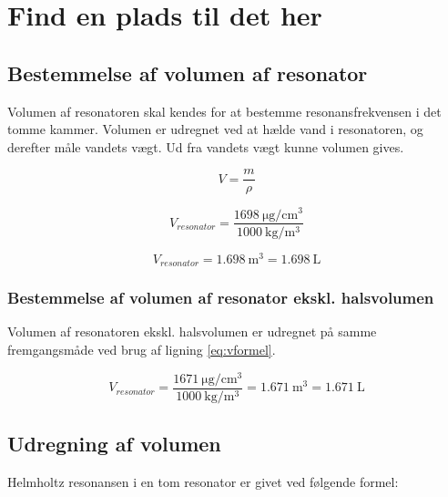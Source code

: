 \chapter{Find en plads til det her}

\section{Bestemmelse af volumen af resonator}

Volumen af resonatoren skal kendes for at bestemme resonansfrekvensen i det tomme kammer. Volumen er udregnet ved at hælde vand i resonatoren, og derefter måle vandets vægt. Ud fra vandets vægt kunne volumen gives. 

\begin{equation}
  V=\frac{m}{\rho}
  \label{eq:vformel}
\end{equation}

\begin{equation}
V_{resonator}=\frac{\SI{1698}{\micro\gram \per \centi\meter^{3}}}{\SI{1000}{\kilo \gram \per \meter^{3}}}
\end{equation}

\begin{equation}
	V_{resonator}={\SI{1.698}{\meter^{3}}}={\SI{1.698}{\liter}}
\end{equation}

\subsection{Bestemmelse af volumen af resonator ekskl. halsvolumen}

Volumen af resonatoren ekskl. halsvolumen er udregnet på samme fremgangsmåde ved brug af ligning \ref{eq:vformel}. 

\begin{equation}
V_{resonator}=\frac{\SI{1671}{\micro\gram \per \centi\meter^{3}}}{\SI{1000}{\kilo \gram \per \meter^{3}}}={\SI{1.671}{\meter^{3}}}={\SI{1.671}{\liter}}
\end{equation}

\section{Udregning af volumen}

Helmholtz resonansen i en tom resonator er givet ved følgende formel: \fnul

